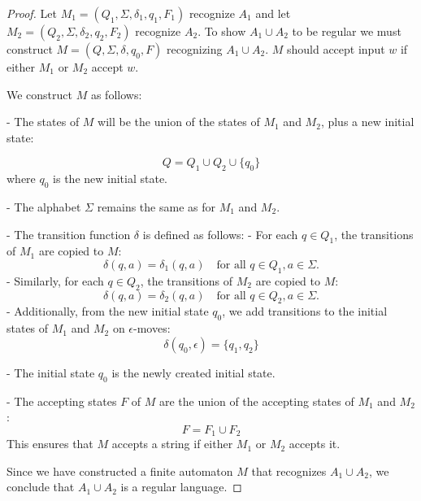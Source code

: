 \documentclass[12pt]{article}
\begin{document}
\begin{proof}
    Let \(M_1 = (Q_1, \Sigma, \delta_1, q_1, F_1)\) recognize \(A_1\)
    and 
    let \(M_2 = (Q_2, \Sigma, \delta_2, q_2, F_2)\) recognize \(A_2\). 
    To show \(A_1 \cup A_2\) to be regular we must construct 
    \(M = (Q, \Sigma, \delta, q_0, F)\) recognizing \(A_1 \cup A_2\). 
    \(M\) should accept input \(w\) if either \(M_1\) or \(M_2\) accept \(w\).

    \noindent 
    We construct \(M\) as follows:
    
    \noindent 
    - The states of \(M\) will be the union of the states of \(M_1\) and \(M_2\), plus a new initial state: 

      \[
      Q = Q_1 \cup Q_2 \cup \{q_0\}
      \]
      where \(q_0\) is the new initial state.
    
      \noindent 
    - The alphabet \(\Sigma\) remains the same as for \(M_1\) and \(M_2\).

    \noindent 
    - The transition function \(\delta\) is defined as follows:
      - For each \(q \in Q_1\), the transitions of \(M_1\) are copied to \(M\):
        \[
        \delta(q, a) = \delta_1(q, a) \quad \text{for all } q \in Q_1, a \in \Sigma.
        \]
      - Similarly, for each \(q \in Q_2\), the transitions of \(M_2\) are copied to \(M\):
        \[
        \delta(q, a) = \delta_2(q, a) \quad \text{for all } q \in Q_2, a \in \Sigma.
        \]
      - Additionally, from the new initial state \(q_0\), we add transitions to the initial states of \(M_1\) and \(M_2\) on \(\epsilon\)-moves:
        \[
        \delta(q_0, \epsilon) = \{q_1, q_2\}
        \]
    
        \noindent 
    - The initial state \(q_0\) is the newly created initial state.

    \noindent 
    - The accepting states \(F\) of \(M\) are the union of the accepting states of \(M_1\) and \(M_2\):
      \[
      F = F_1 \cup F_2
      \]
      This ensures that \(M\) accepts a string if either \(M_1\) or \(M_2\) accepts it.

      \noindent
    Since we have constructed a finite automaton \(M\) that recognizes \(A_1 \cup A_2\), we conclude that \(A_1 \cup A_2\) is a regular language.

\end{proof}
\end{document}
